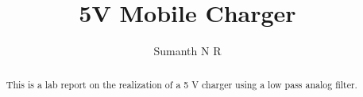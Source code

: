 \documentclass[journal,12pt,twocolumn]{IEEEtran}
\DeclareMathOperator*{\Res}{Res}
\begin{document}
\theoremstyle{definition}
\newtheorem{theorem}{Theorem}[section]
\newtheorem{problem}{Problem}
\newtheorem{proposition}{Proposition}[section]
\newtheorem{lemma}{Lemma}[section]
\newtheorem{corollary}[theorem]{Corollary}
\newtheorem{example}{Example}[section]
\newtheorem{definition}{Definition}[section]
\newcommand{\define}{\stackrel{\triangle}{=}}
\newcommand{\myvec}[1]{\ensuremath{\begin{pmatrix}#1\end{pmatrix}}}
\newcommand{\mydet}[1]{\ensuremath{\begin{vmatrix}#1\end{vmatrix}}}


\providecommand{\qfunc}[1]{\ensuremath{Q\left(#1\right)}}
\providecommand{\sbrak}[1]{\ensuremath{{}\left[#1\right]}}
\providecommand{\lsbrak}[1]{\ensuremath{{}\left[#1\right.}}
\providecommand{\rsbrak}[1]{\ensuremath{{}\left.#1\right]}}
\providecommand{\brak}[1]{\ensuremath{\left(#1\right)}}
\providecommand{\lbrak}[1]{\ensuremath{\left(#1\right.}}
\providecommand{\rbrak}[1]{\ensuremath{\left.#1\right)}}
\providecommand{\cbrak}[1]{\ensuremath{\left\{#1\right\}}}
\providecommand{\lcbrak}[1]{\ensuremath{\left\{#1\right.}}
\providecommand{\rcbrak}[1]{\ensuremath{\left.#1\right\}}}
\theoremstyle{remark}
\newtheorem{rem}{Remark}
\newcommand{\sgn}{\mathop{\mathrm{sgn}}}
\providecommand{\abs}[1]{\left\vert#1\right\vert}
\providecommand{\res}[1]{\Res\displaylimits_{#1}} 
\providecommand{\norm}[1]{\lVert#1\rVert}
\providecommand{\mtx}[1]{\mathbf{#1}}
\providecommand{\mean}[1]{E\left[ #1 \right]}
\providecommand{\fourier}{\overset{\mathcal{F}}{ \rightleftharpoons}}
\providecommand{\ztrans}{\overset{\mathcal{Z}}{ \rightleftharpoons}}
\providecommand{\diff}[2]{\ensuremath{\frac{d{#1}}{d{#2}}}}
\providecommand{\system}[1]{\overset{\mathcal{#1}}{\longleftrightarrow}}
\newcommand{\solution}{\noindent \textbf{Solution: }}
\renewcommand{\thefigure}{\arabic{section}.\arabic{figure}}
\makeatletter
{}
\makeatother

\vspace{3cm}
\title{5V Mobile Charger}
\author{Sumanth N R}
\maketitle
\tableofcontents
\renewcommand{\thetable}{\theenumi}
\bigskip

\begin{abstract}
    This is a lab report on the realization of a 5 V charger using
    a low pass analog filter.
\end{abstract}
\end{document}
